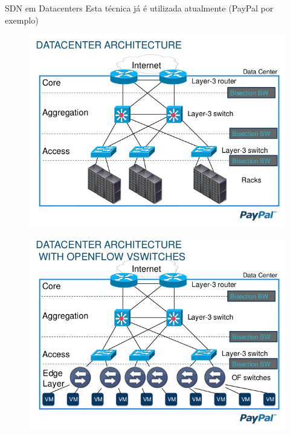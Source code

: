 \documentclass[aspectratio=169]{beamer}
\begin{document}
	\begin{frame} {SDN em Datacenters}
		Esta técnica já é utilizada atualmente (PayPal por exemplo)
		\begin{figure}[ht]   
			\includegraphics[scale=0.35]{imagens/sdn-1.jpg}
			\label{fig:sample_figure}
		\end{figure}
		
		\begin{figure}[ht]   
			\includegraphics[scale=0.35]{imagens/sdn-2.jpg}
			\label{fig:sample_figure}
		\end{figure}
	\end{frame}
\end{document}
